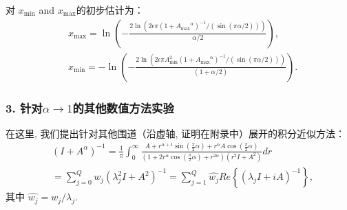 对 $x_{\min}$ and $x_{\max}$的初步估计为：
\begin{equation}
	\begin{aligned}
		&x_{\max}=\ln\left(-\frac{2\ln(2\epsilon \pi (1+{A_{\max}}^{\alpha})^{-1}/(\sin(\pi \alpha /2)))}{ \alpha/2}\right),\\
		&x_{\min}=-\ln\left(-\frac{2\ln(2\epsilon \pi A^2_{\min} (1+{A_{\max}}^{\alpha})^{-1}/(\sin(\pi\alpha/2)))}{(1+\alpha/2)}\right).
	\end{aligned}
	\label{findminmax_DE1_q}
\end{equation}

\subsubsection{3. 针对\(\alpha \rightarrow 1\)的其他数值方法实验}
在这里, 我们提出针对其他围道（沿虚轴, 证明在附录中）展开的积分近似方法：
\begin{equation}\label{function_q_alpha_2}
	\begin{aligned}
		&(I+A^{\alpha})^{-1}=\frac{1}{\pi} \int_{0}^{\infty} 	\frac{A+r^{\alpha+1}\sin\left(\frac{\pi}{2}\alpha\right)+r^{\alpha}A\cos\left(\frac{\pi}{2} \alpha\right)}
		{\left(1+2r^{\alpha}\cos(\frac{\pi}{2} \alpha)+r^{2\alpha}\right)\left(r^2I+A^2\right)} dr\\
		&=\sum_{j=0}^{Q}w_j(\lambda_j^2 I+A^2)^{-1}
		=\sum_{j=1}^{Q}\hat{w_j}Re\left\{\left(\lambda_jI+iA\right)^{-1}\right\},
	\end{aligned}
\end{equation}
其中 $\hat{w_j}=w_j/{\lambda_j} $.	

